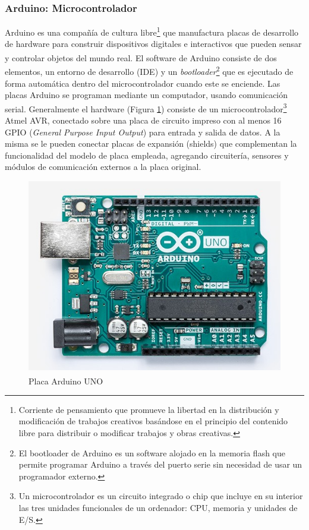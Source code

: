         \subsubsection{Arduino: Microcontrolador}
        
            \par Arduino\textsuperscript{\textregistered} es una compañía de cultura libre\footnote{Corriente de pensamiento que promueve la libertad en la distribución y modificación de trabajos creativos basándose en el principio del contenido libre para distribuir o modificar trabajos y obras creativas.} que manufactura placas de desarrollo de hardware para construir dispositivos digitales e interactivos que pueden sensar y controlar objetos del mundo real. El software de Arduino\textsuperscript{\textregistered} consiste de dos elementos, un entorno de desarrollo (IDE) y un \textit{bootloader}\footnote{El bootloader de Arduino es un software alojado en la memoria flash que permite programar Arduino a través del puerto serie sin necesidad de usar un programador externo.} que es ejecutado de forma automática dentro del microcontrolador cuando este se enciende. Las placas Arduino se programan mediante un computador, usando comunicación serial. Generalmente el hardware (Figura \ref{boardArduino}) consiste de un microcontrolador\footnote{Un microcontrolador es un circuito integrado o chip que incluye en su interior las tres unidades funcionales de un ordenador: CPU, memoria y unidades de E/S.} Atmel AVR, conectado sobre una placa de circuito impreso con al menos 16 GPIO (\textit{General Purpose Input Output}) para entrada y salida de datos. A la misma se le pueden conectar placas de expansión (shields) que complementan la funcionalidad del modelo de placa empleada, agregando circuitería, sensores y módulos de comunicación externos a la placa original.
        
            \begin{figure}[h]
                \centering
                \includegraphics[scale=0.6]{hardware/Arduino.jpg}
                \caption{Placa Arduino\textsuperscript{\textregistered} UNO}
                \label{boardArduino}
            \end{figure}
        
